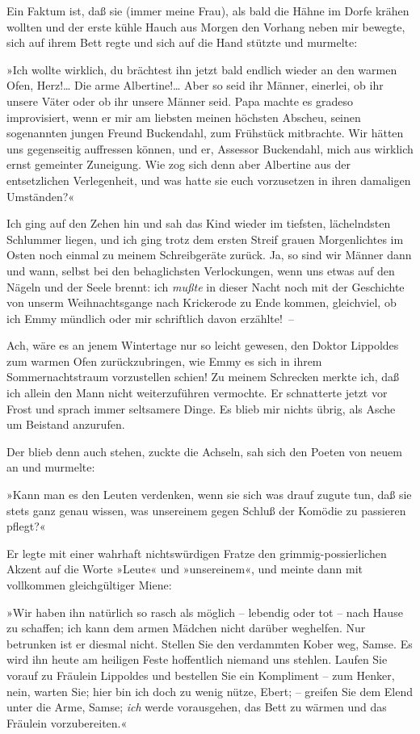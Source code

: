 Ein Faktum ist, daß sie (immer meine Frau), als bald die Hähne im
Dorfe krähen wollten und der erste kühle Hauch aus Morgen den
Vorhang neben mir bewegte, sich auf ihrem Bett regte und sich auf
die Hand stützte und murmelte:

»Ich wollte wirklich, du brächtest ihn jetzt bald endlich wieder an
den warmen Ofen, Herz!\ldots{} Die arme Albertine!\ldots{} Aber so seid ihr
Männer, einerlei, ob ihr unsere Väter oder ob ihr unsere Männer
seid. Papa machte es gradeso improvisiert, wenn er mir am liebsten
meinen höchsten Abscheu, seinen sogenannten jungen Freund
Buckendahl, zum Frühstück mitbrachte. Wir hätten uns gegenseitig
auffressen können, und er, Assessor Buckendahl, mich aus wirklich
ernst gemeinter Zuneigung. Wie zog sich denn aber Albertine aus der
entsetzlichen Verlegenheit, und was hatte sie euch vorzusetzen in
ihren damaligen Umständen?«

Ich ging auf den Zehen hin und sah das Kind wieder im tiefsten,
lächelndsten Schlummer liegen, und ich ging trotz dem ersten Streif
grauen Morgenlichtes im Osten noch einmal zu meinem Schreibgeräte
zurück. Ja, so sind wir Männer dann und wann, selbst bei den
behaglichsten Verlockungen, wenn uns etwas auf den Nägeln und der
Seele brennt: ich \emph{mußte} in dieser Nacht noch mit der
Geschichte von unserm Weihnachtsgange nach Krickerode zu Ende
kommen, gleichviel, ob ich Emmy mündlich oder mir schriftlich davon
erzählte!~–

Ach, wäre es an jenem Wintertage nur so leicht gewesen, den Doktor
Lippoldes zum warmen Ofen zurückzubringen, wie Emmy es sich in
ihrem Sommernachtstraum vorzustellen schien! Zu meinem Schrecken
merkte ich, daß ich allein den Mann nicht weiterzuführen vermochte.
Er schnatterte jetzt vor Frost und sprach immer seltsamere Dinge.
Es blieb mir nichts übrig, als Asche um Beistand anzurufen.

Der blieb denn auch stehen, zuckte die Achseln, sah sich den Poeten
von neuem an und murmelte:

»Kann man es den Leuten verdenken, wenn sie sich was drauf zugute
tun, daß sie stets ganz genau wissen, was unsereinem gegen Schluß
der Komödie zu passieren pflegt?«

Er legte mit einer wahrhaft nichtswürdigen Fratze den
grimmig-possierlichen Akzent auf die Worte »Leute« und
»unsereinem«, und meinte dann mit vollkommen gleichgültiger Miene:

»Wir haben ihn natürlich so rasch als möglich – lebendig oder tot –
nach Hause zu schaffen; ich kann dem armen Mädchen nicht darüber
weghelfen. Nur betrunken ist er diesmal nicht. Stellen Sie den
verdammten Kober weg, Samse. Es wird ihn heute am heiligen Feste
hoffentlich niemand uns stehlen. Laufen Sie vorauf zu Fräulein
Lippoldes und bestellen Sie ein Kompliment – zum Henker, nein,
warten Sie; hier bin ich doch zu wenig nütze, Ebert; – greifen Sie
dem Elend unter die Arme, Samse; \emph{ich} werde vorausgehen, das
Bett zu wärmen und das Fräulein vorzubereiten.«

